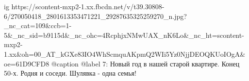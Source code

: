  
 
 
 
 

\ifcmt
  ig https://scontent-mxp2-1.xx.fbcdn.net/v/t39.30808-6/270050418_2801613353471221_29287635325259270_n.jpg?_nc_cat=109&ccb=1-5&_nc_sid=b9115d&_nc_ohc=4RcphjxNMwUAX_nK6Lo&_nc_ht=scontent-mxp2-1.xx&oh=00_AT_kGXe83IO4WhScmquAKpmQ2WIi5Yz0NjjDEOQKUoIOgA&oe=61D9CFD8
  @caption @label 7: Новый год в нашей старой квартире. Конец 50-х. Родня и соседи. Шулявка - одна семья!
\fi
